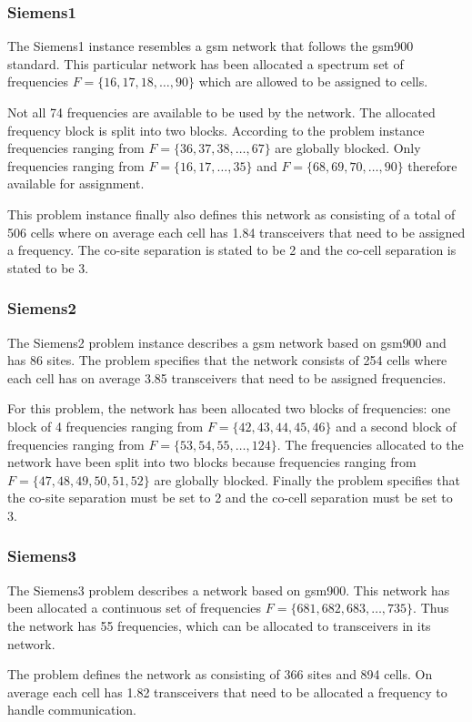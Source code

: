 \subsubsection{Siemens1}
The Siemens1 instance resembles a \gls{gsm} network that follows the \gls{gsm}900 standard. This particular network has been allocated a spectrum set of frequencies $F = \{16,17,18,\dots,90\}$ which are allowed to be assigned to cells. 

Not all 74 frequencies are available to be used by the network. The allocated frequency block is split into two blocks. According to the problem instance frequencies ranging from $F= \{36,37,38,\dots,67\}$ are globally blocked. Only frequencies ranging from $F= \{16,17,\dots,35\}$ and $F= \{68,69,70,\dots,90\}$ therefore available for assignment.

This problem instance finally also defines this network as consisting of a total of 506 cells where on average each cell has 1.84 transceivers that need to be assigned a frequency. The co-site separation is stated to be 2 and the co-cell separation is stated to be 3.
\subsubsection{Siemens2}
The Siemens2 problem instance describes a \gls{gsm} network based on \gls{gsm}900 and has 86 sites. The problem specifies that the network consists of 254 cells where each cell has on average 3.85 transceivers that need to be assigned frequencies.

For this problem, the network has been allocated two blocks of frequencies: one block of 4 frequencies ranging from $F = \{42,43,44,45,46\}$ and a second block of frequencies ranging from $F= \{53,54,55,\dots,124\}$. The frequencies allocated to the network have been split into two blocks because frequencies ranging from $F = \{47,48,49,50,51,52\}$ are globally blocked. Finally the problem specifies that the co-site separation must be set to 2 and the co-cell separation must be set to 3.
\subsubsection{Siemens3}
The Siemens3 problem describes a network based on \gls{gsm}900. This network has been allocated a continuous set of frequencies $F= \{681,682,683, \dots, 735\}$. Thus the network has 55 frequencies, which can be allocated to transceivers in its network.

The problem defines the network as consisting of 366 sites and 894 cells. On average each cell has 1.82 transceivers that need to be allocated a frequency to handle communication.
